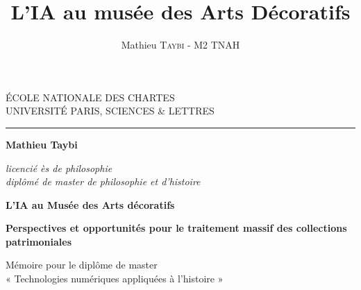 \documentclass[12pt,twoside]{book}
\author{Mathieu \textsc{Taybi} - M2 TNAH}
\title{L'IA au musée des Arts Décoratifs}
\begin{document}
	\begin{titlepage}
		\begin{center}
			
			\bigskip
			
			\begin{large}				
				ÉCOLE NATIONALE DES CHARTES\\
				UNIVERSITÉ PARIS, SCIENCES \& LETTRES
			\end{large}
			\begin{center}\rule{2cm}{0.02cm}\end{center}
			
			\bigskip
			\bigskip
			\bigskip
			\begin{Large}
				\textbf{Mathieu Taybi}\\
			\end{Large}
			\begin{normalsize} \textit{licencié ès de philosophie}\\
				\textit{diplômé de master de philosophie et d'histoire}
			\end{normalsize}
			
			\bigskip
			\bigskip
			\bigskip
			
			\begin{Huge}
				\textbf{L'IA au Musée des Arts décoratifs}\\
			\end{Huge}
			\bigskip
			\bigskip
			\begin{LARGE}
				\textbf{Perspectives et opportunités pour le traitement massif des collections patrimoniales}\\
			\end{LARGE}
			
			\bigskip
			\bigskip
			\bigskip
			\begin{large}
			\end{large}
			\vfill
			
			\begin{large}
				Mémoire 
				pour le diplôme de master \\
				« Technologies numériques appliquées à l'histoire » \\
			\end{large}
			
		\end{center}
	\end{titlepage}
	
\frontmatter

\end{document}
